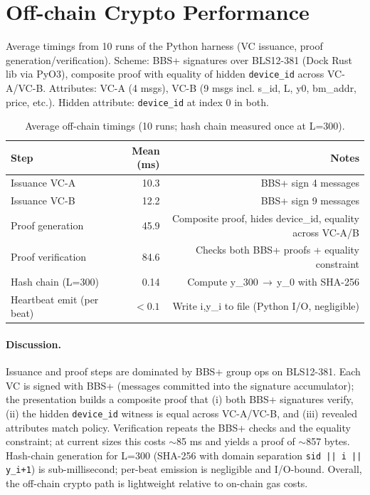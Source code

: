 \documentclass{article}
\begin{document}
\section*{Off-chain Crypto Performance}
Average timings from 10 runs of the Python harness (VC issuance, proof generation/verification). Scheme: BBS+ signatures over BLS12-381 (Dock Rust lib via PyO3), composite proof with equality of hidden \texttt{device\_id} across VC-A/VC-B. Attributes: VC-A (4 msgs), VC-B (9 msgs incl. s\_id, L, y0, bm\_addr, price, etc.). Hidden attribute: \texttt{device\_id} at index 0 in both.

\begin{table}[h!]
  \centering
  \begin{tabular}{lrr}
    \toprule
    Step & Mean (ms) & Notes \\
    \midrule
    Issuance VC-A & 10.3 & BBS+ sign 4 messages \\
    Issuance VC-B & 12.2 & BBS+ sign 9 messages \\
    Proof generation & 45.9 & Composite proof, hides device\_id, equality across VC-A/B \\
    Proof verification & 84.6 & Checks both BBS+ proofs + equality constraint \\
    Hash chain (L=300) & 0.14 & Compute y\_{300}\,$\rightarrow$\,y\_0 with SHA-256 \\
    Heartbeat emit (per beat) & $<0.1$ & Write i,y\_i to file (Python I/O, negligible) \\
    \bottomrule
  \end{tabular}
  \caption{Average off-chain timings (10 runs; hash chain measured once at L=300).}
\end{table}

\paragraph{Discussion.} Issuance and proof steps are dominated by BBS+ group ops on BLS12-381. Each VC is signed with BBS+ (messages committed into the signature accumulator); the presentation builds a composite proof that (i) both BBS+ signatures verify, (ii) the hidden \texttt{device\_id} witness is equal across VC-A/VC-B, and (iii) revealed attributes match policy. Verification repeats the BBS+ checks and the equality constraint; at current sizes this costs $\sim$85 ms and yields a proof of $\sim$857 bytes. Hash-chain generation for L=300 (SHA-256 with domain separation \texttt{sid || i || y\_{i+1}}) is sub-millisecond; per-beat emission is negligible and I/O-bound. Overall, the off-chain crypto path is lightweight relative to on-chain gas costs.
\end{document}
